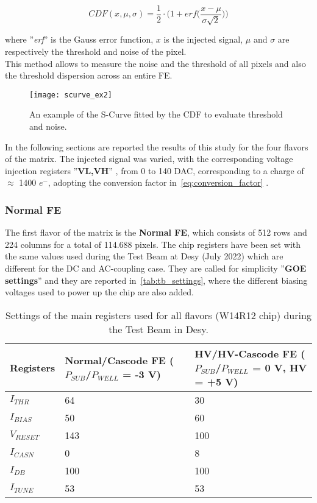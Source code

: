 \begin{equation}
 CDF(x,\mu,\sigma) = \frac{1}{2} \cdot \bigg(1 + \textit{erf}\bigg(\frac{x-\mu}{\sigma \sqrt{2}}\bigg)\bigg)
\label{eq:s-curve}
\end{equation}

where ''\textit{erf}'' is the Gauss error function, $x$ is the injected signal, $\mu$ and $\sigma$ are respectively the threshold and noise of the pixel.  \\

This method allows to measure the noise and the threshold of all pixels and also the threshold dispersion across an entire FE.

\begin{figure}
\centering
\texttt{[image: scurve\_ex2]}
\caption{An example of the S-Curve fitted by the CDF to evaluate threshold and noise.}
\label{fig:ex_scurve}
\end{figure}

In the following sections are reported the results of this study for the four flavors of the matrix. The injected signal was varied, with the corresponding voltage injection registers ''\textbf{VL,VH}'' , from 0 to 140 DAC, corresponding to a charge of $\approx$ 1400 $e^{-}$, adopting the conversion factor in~\autoref{eq:conversion_factor} .


\subsubsection{Normal FE}

The first flavor of the matrix is the \textbf{Normal FE}, which consists of 512 rows and 224 columns for a total of 114.688 pixels. The chip registers have been set with the same values used during the Test Beam at Desy (July 2022) which are different for the DC and AC-coupling case. They are called for simplicity ''\textbf{GOE settings}'' and they are reported in~\autoref{tab:tb_settings}, where the different biasing voltages used to power up the chip are also added.

\begin{table}[h!]
\centering
\begin{tabular}{C{3.2cm}|C{3.7cm}|C{3.5cm}}
Registers & Normal/Cascode FE ($P_{SUB}$/$P_{WELL}$ = -3 V) & HV/HV-Cascode FE ($P_{SUB}$/$P_{WELL}$ = 0 V, HV = +5 V)\\[2ex]
\hline
\hline
$I_{THR}$ & 64 & 30\\[0.5ex]
\hline
$I_{BIAS}$ & 50 & 60\\
\hline
$V_{RESET}$ & 143 & 100\\
\hline
$I_{CASN}$ & 0 & 8\\
\hline
$I_{DB}$ & 100 & 100\\
\hline
$I_{TUNE}$ & 53 & 53\\
\hline
\hline
\end{tabular}
\caption{Settings of the main registers used for all flavors (W14R12 chip) during the Test Beam in Desy.}
\label{tab:tb_settings}
\end{table}



